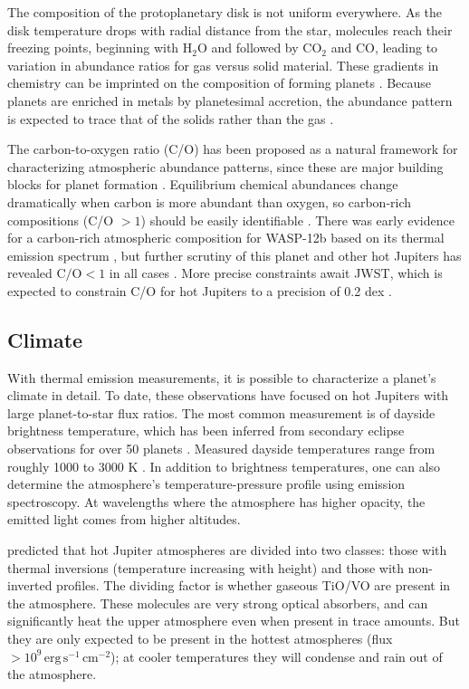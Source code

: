 \documentclass[graybox,natbib,nosecnum]{svmult}
\begin{document}
The composition of the protoplanetary disk is not uniform everywhere. As the disk temperature drops with radial distance from the star, molecules reach their freezing points, beginning with H$_2$O and followed by CO$_2$ and CO, leading to variation in abundance ratios for gas versus solid material. These gradients in chemistry can be imprinted on the composition of forming planets \citep[e.g.][]{oberg11, madhusudhan14, alidib16}. Because planets are enriched in metals by planetesimal accretion, the abundance pattern is expected to trace that of the solids rather than the gas \citep{mordasini16, espinoza17}.

The carbon-to-oxygen ratio (C/O) has been proposed as a natural framework for characterizing atmospheric abundance patterns, since these are major building blocks for planet formation \citep{madhusudhan12}.  Equilibrium chemical abundances change dramatically when carbon is more abundant than oxygen, so carbon-rich compositions (C/O $> 1$) should be easily identifiable \citep{moses13}.  There was early evidence for a carbon-rich atmospheric composition for WASP-12b based on its thermal emission spectrum \citep{madhusudhan11}, but further scrutiny of this planet and other hot Jupiters has revealed $\mathrm{C/O} < 1$ in all cases \citep{line14, kreidberg15b, benneke15, barstow17}. More precise constraints await JWST, which is expected to constrain C/O for hot Jupiters to a precision of 0.2 dex \citep{greene16}.

\subsection{Climate}
With thermal emission measurements, it is possible to characterize a planet's climate in detail.  To date, these observations have focused on hot Jupiters with large planet-to-star flux ratios. The most common measurement is of dayside brightness temperature, which has been inferred from secondary eclipse observations for over 50 planets \citep{schwartz15}. Measured dayside temperatures range from roughly 1000 to 3000 K \citep{stevenson14b, kammer15, morley17}.  In addition to brightness temperatures, one can also determine the atmosphere's temperature-pressure profile using emission spectroscopy. At wavelengths where the atmosphere has higher opacity, the emitted light comes from higher altitudes. 

\cite{fortney08} predicted that hot Jupiter atmospheres are divided into two classes: those with thermal inversions (temperature increasing with height) and those with non-inverted profiles. The dividing factor is whether gaseous TiO/VO are present in the atmosphere. These molecules are very strong optical absorbers, and can significantly heat the upper atmosphere even when present in trace amounts. But they are only expected to be present in the hottest atmospheres (flux $>10^9\,\mathrm{erg}\,\mathrm{s}^{-1}\,\mathrm{cm}^{-2}$); at cooler temperatures they will condense and rain out of the atmosphere.
\end{document}
